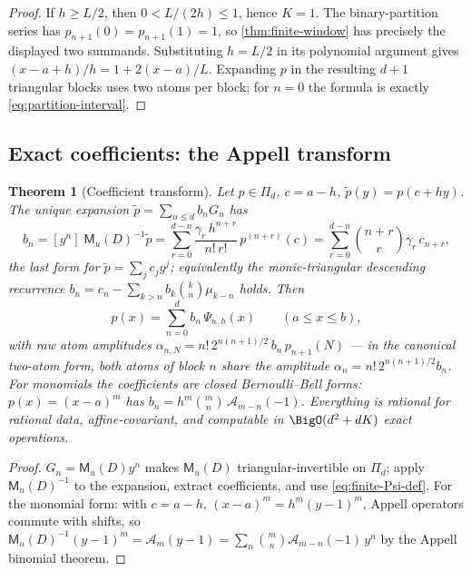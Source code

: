 \documentclass[11pt,oneside]{article}
\numberwithin{equation}{section}
\newtheorem{theorem}{Theorem}[section]
\theoremstyle{definition}
\theoremstyle{remark}
\newcommand{\MM}{\mathsf M}
\newcommand{\Gd}{\mathcal A}
\newcommand{\PiD}{\Pi_d}
\begin{document}
\begin{proof}
If $h\ge L/2$, then $0<L/(2h)\le1$, hence $K=1$.  The binary-partition
series has $p_{n+1}(0)=p_{n+1}(1)=1$, so
\cref{thm:finite-window} has precisely the displayed two summands.  Substituting
$h=L/2$ in its polynomial argument gives
$(x-a+h)/h=1+2(x-a)/L$.  Expanding $p$ in the resulting $d+1$
triangular blocks uses two atoms per block; for $n=0$ the formula is
exactly \eqref{eq:partition-interval}.
\end{proof}

\subsection{Exact coefficients: the Appell transform}

\begin{theorem}[Coefficient transform]
\label{thm:coefficient-transform}
Let $p\in\PiD$, $c=a-h$, $\widetilde p(y)=p(c+hy)$.  The unique
expansion $\widetilde p=\sum_{n\le d}b_nG_n$ has
\begin{equation}
 b_n=[y^{n}]\;\MM_u(D)^{-1}\widetilde p
 =\sum_{r=0}^{d-n}\frac{\gamma_r\,h^{n+r}}{n!\,r!}\,
 p^{(n+r)}(c)
 =\sum_{r=0}^{d-n}\binom{n+r}{r}\gamma_r\,c_{n+r},
 \label{eq:b-formulas}
\end{equation}
the last form for $\widetilde p=\sum_jc_jy^{j}$; equivalently the
monic-triangular descending recurrence
$b_n=c_n-\sum_{k>n}b_k\binom kn\mu_{k-n}$ holds.  Then
\begin{equation}
 p(x)=\sum_{n=0}^{d}b_n\,\Psi_{n,h}(x)
 \qquad(a\le x\le b),
 \label{eq:p-Psi}
\end{equation}
with raw atom amplitudes
$\alpha_{n,N}=n!\,2^{n(n+1)/2}\,b_n\,p_{n+1}(N)$ --- in the canonical
two-atom form, both atoms of block $n$ share the amplitude
$\alpha_n=n!\,2^{n(n+1)/2}b_n$.  For monomials the coefficients are
closed Bernoulli--Bell forms: $p(x)=(x-a)^{m}$ has
$b_n=h^{m}\binom mn\,\Gd_{m-n}(-1)$.  Everything is rational for
rational data, affine-covariant, and computable in
$\BigO(d^{2}+dK)$ exact operations.
\end{theorem}

\begin{proof}
$G_n=\MM_u(D)y^{n}$ makes $\MM_u(D)$ triangular-invertible on
$\PiD$; apply $\MM_u(D)^{-1}$ to the expansion, extract coefficients,
and use \eqref{eq:finite-Psi-def}.  For the monomial form: with $c=a-h$,
$(x-a)^{m}=h^{m}(y-1)^{m}$, Appell operators commute with shifts, so
$\MM_u(D)^{-1}(y-1)^{m}=\Gd_m(y-1)
=\sum_n\binom mn\Gd_{m-n}(-1)\,y^{n}$ by the Appell binomial
theorem.
\end{proof}
\end{document}
